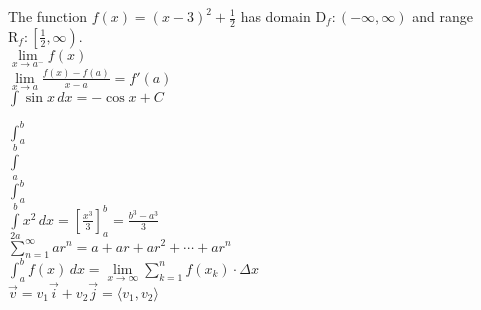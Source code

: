 \documentclass[11pt]{article}
\begin{document}
The function $f(x)=(x-3)^2+\displaystyle{\frac{1}{2}}$ has domain $\mathrm{D}_f:(-\infty,\infty)$ and range $\mathrm{R}_f:\left[\displaystyle{\frac{1}{2}},\infty\right)$.\\

$\lim \limits_{x \to a^-}f(x)$\\

$\displaystyle{\lim\limits_{x \to a} \frac{f(x)-f(a)}{x-a}=f'(a)}$\\

$\displaystyle{\int \sin x \, dx = -\cos x + C}$

$\int_a^b$ \\

$\int \limits_a^b$\\


$\displaystyle{\int_a^b}$ \\

$\displaystyle{\int \limits_{2a}^{b}x^2\,dx=\left[\frac{x^3}{3}\right]_a^b = \frac{b^3-a^3}{3}}$\\

$\displaystyle{\sum \limits_{n=1}^{\infty}ar^n=a+ar+ar^2+\cdots+ar^n}$\\

$\displaystyle{\int_a^bf(x)\,dx=\lim\limits_{x \to \infty}\sum\limits_{k=1}^n f(x_k)\cdot\Delta x}$\\

$\vec{v}=v_1\vec{i}+v_2\vec{j}=\langle v_1,v_2 \rangle $
\end{document}
